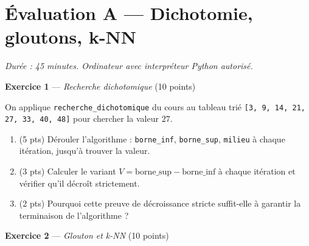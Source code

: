 \section*{Évaluation A --- Dichotomie, gloutons, k-NN} \textit{Durée : 45 minutes. Ordinateur avec interpréteur Python autorisé.}


\bigskip

\textbf{Exercice 1} --- \textit{Recherche dichotomique} \hfill (10 points)

On applique \lstinline{recherche_dichotomique} du cours au tableau trié
\lstinline{[3, 9, 14, 21, 27, 33, 40, 48]} pour chercher la valeur $27$.

\begin{enumerate}
  \item (5 pts) Dérouler l'algorithme : \lstinline{borne_inf}, \lstinline{borne_sup}, \lstinline{milieu} à chaque itération, jusqu'à trouver la valeur.
  \item (3 pts) Calculer le variant $V=\text{borne\_sup}-\text{borne\_inf}$ à chaque itération et vérifier qu'il décroît strictement.
  \item (2 pts) Pourquoi cette preuve de décroissance stricte suffit-elle à garantir la terminaison de l'algorithme ?
\end{enumerate}


\bigskip

\textbf{Exercice 2} --- \textit{Glouton et k-NN} \hfill (10 points)

